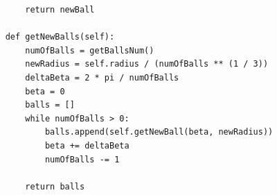 \documentclass[utf8x, 14pt, oneside, a4paper]{article}
\begin{document}
\begin{lstlisting}
        return newBall

    def getNewBalls(self):
        numOfBalls = getBallsNum()
        newRadius = self.radius / (numOfBalls ** (1 / 3))
        deltaBeta = 2 * pi / numOfBalls
        beta = 0
        balls = []
        while numOfBalls > 0:
            balls.append(self.getNewBall(beta, newRadius))
            beta += deltaBeta
            numOfBalls -= 1

        return balls
\end{lstlisting}
\pagebreak
{}
\end{document}
